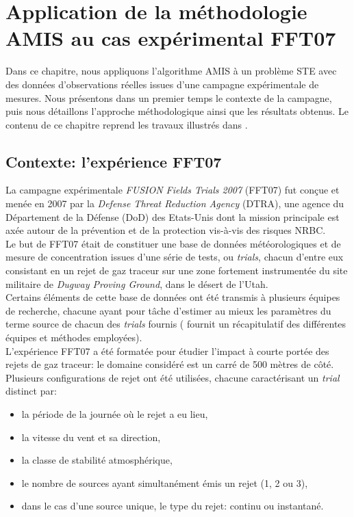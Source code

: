 \setcounter{chapter}{2}

\chapter{{Application de la méthodologie AMIS au cas expérimental FFT07}}

Dans ce chapitre, nous appliquons l'algorithme AMIS à un problème STE avec des données d'observations réelles issues d'une campagne expérimentale de mesures. Nous présentons dans un premier temps le contexte de la campagne, puis nous détaillons l'approche méthodologique ainsi que les résultats obtenus. Le contenu de ce chapitre reprend les travaux illustrés dans \cite{Rajaona2015}.

\section{Contexte: l'expérience FFT07}

La campagne expérimentale \textit{FUSION Fields Trials 2007} (FFT07) fut conçue et menée en 2007 par la \textit{Defense Threat Reduction Agency} (DTRA), une agence du Département de la Défense (DoD) des Etats-Unis dont la mission principale est axée autour de la prévention et de la protection vis-à-vis des risques NRBC.\\

Le but de FFT07 était de constituer une base de données météorologiques et de mesure de concentration issues d'une série de tests, ou \textit{trials}, chacun d'entre eux consistant en un rejet de gaz traceur sur une zone fortement instrumentée du site militaire de \textit{Dugway Proving Ground}, dans le désert de l'Utah.\\

Certains éléments de cette base de données ont été transmis à plusieurs équipes de recherche, chacune ayant pour tâche d'estimer au mieux les paramètres du terme source de chacun des \textit{trials} fournis (\cite{Platt2010} fournit un récapitulatif des différentes équipes et méthodes employées).\\

L'expérience FFT07 a été formatée pour étudier l'impact à courte portée des rejets de gaz traceur: le domaine considéré est un carré de 500 mètres de côté. Plusieurs configurations de rejet ont été utilisées, chacune caractérisant un \textit{trial} distinct par:
\begin{itemize}
	\item la période {de la journée} où le rejet a eu lieu,
	\item la vitesse du vent et sa direction,
	\item la classe de stabilité atmosphérique,
	\item le nombre de sources ayant simultanément émis un rejet (1, 2 ou 3),
	\item dans le cas d'une source unique, le type du rejet: continu ou instantané.\\
\end{itemize}

